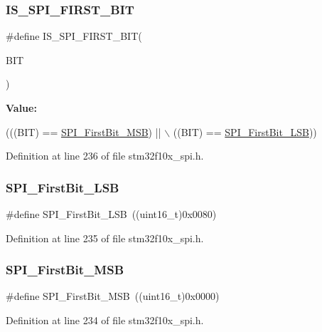 \subsubsection{\texorpdfstring{I\+S\+\_\+\+S\+P\+I\+\_\+\+F\+I\+R\+S\+T\+\_\+\+B\+IT}{IS\_SPI\_FIRST\_BIT}}
{\footnotesize\ttfamily \#define I\+S\+\_\+\+S\+P\+I\+\_\+\+F\+I\+R\+S\+T\+\_\+\+B\+IT(\begin{DoxyParamCaption}\item[{}]{B\+IT }\end{DoxyParamCaption})}

{\bfseries Value\+:}
\begin{DoxyCode}
(((BIT) == \hyperlink{group___s_p_i___m_s_b___l_s_b__transmission_ga45e688f93a93b605886240cad23bc2eb}{SPI\_FirstBit\_MSB}) || \(\backslash\)
                               ((BIT) == \hyperlink{group___s_p_i___m_s_b___l_s_b__transmission_ga5ef57fca79434cbc517e4ede548ca02d}{SPI\_FirstBit\_LSB}))
\end{DoxyCode}


Definition at line 236 of file stm32f10x\+\_\+spi.\+h.

\mbox{\label{group___s_p_i___m_s_b___l_s_b__transmission_ga5ef57fca79434cbc517e4ede548ca02d}} 
\subsubsection{\texorpdfstring{S\+P\+I\+\_\+\+First\+Bit\+\_\+\+L\+SB}{SPI\_FirstBit\_LSB}}
{\footnotesize\ttfamily \#define S\+P\+I\+\_\+\+First\+Bit\+\_\+\+L\+SB~((uint16\+\_\+t)0x0080)}



Definition at line 235 of file stm32f10x\+\_\+spi.\+h.

\mbox{\label{group___s_p_i___m_s_b___l_s_b__transmission_ga45e688f93a93b605886240cad23bc2eb}} 
\subsubsection{\texorpdfstring{S\+P\+I\+\_\+\+First\+Bit\+\_\+\+M\+SB}{SPI\_FirstBit\_MSB}}
{\footnotesize\ttfamily \#define S\+P\+I\+\_\+\+First\+Bit\+\_\+\+M\+SB~((uint16\+\_\+t)0x0000)}



Definition at line 234 of file stm32f10x\+\_\+spi.\+h.

